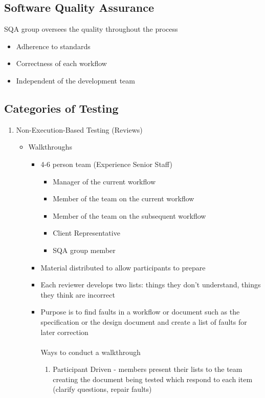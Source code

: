 \documentclass{report}
\begin{document}
			\subsection{Software Quality Assurance}
				SQA group oversees the quality throughout the process
				\begin{itemize}
					\item Adherence to standards
					\item Correctness of each workflow
					\item Independent of the development team
				\end{itemize}
			\subsection{Categories of Testing}
				\begin{enumerate}
					\item Non-Execution-Based Testing (Reviews)
						\begin{itemize}
							\item Walkthroughs
								\begin{itemize}
									\item 4-6 person team  (Experience Senior Staff)
									\begin{itemize}
										\item Manager of the current workflow
										\item Member of the team on the current workflow
										\item Member of the team on the subsequent workflow
										\item Client Representative
										\item SQA group member
									\end{itemize}
									\item Material distributed to allow participants to prepare
									\item Each reviewer develops two lists: things they don't understand, things they think are incorrect
									\item Purpose is to find faults in a workflow or document such as the specification or the design document and create a list of faults for later correction
									\\\\
									Ways to conduct a walkthrough
									\begin{enumerate}
										\item Participant Driven - members present their lists to the team creating the document being tested which respond to each item (clarify questions, repair faults)

\end{enumerate}
\end{itemize}
\end{itemize}
\end{enumerate}
\end{document}
